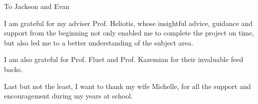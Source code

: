 \documentclass[12pt,american]{report}
\begin{document}
\vfill
\begin{center}
To Jackson and Evan
\end{center}
\vfill

%
I am grateful for my adviser Prof. Heliotis, whose insightful advice, guidance and support from the beginning not only enabled me to complete the project on time, but also led me to a better understanding of the subject area.

I am also grateful for Prof. Fluet and Prof. Kazemian for their invaluable feed backs.

Last but not the least, I want to thank my wife Michelle, for all the support and encouragement during my years at school.

\newcommand{\etc} {\emph{etc.\/}}
\newcommand{\etal}{\emph{et~al.\/}}
\newcommand{\eg}  {\emph{e.g.\/}}
\newcommand{\ie}  {\emph{i.e.\/}}






\afterpreface%
\end{document}
